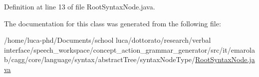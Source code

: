Definition at line 13 of file Root\-Syntax\-Node.\-java.



The documentation for this class was generated from the following file\-:\begin{DoxyCompactItemize}
\item 
/home/luca-\/phd/\-Documents/school luca/dottorato/research/verbal interface/speech\-\_\-workspace/concept\-\_\-action\-\_\-grammar\-\_\-generator/src/it/emarolab/cagg/core/language/syntax/abstract\-Tree/syntax\-Node\-Type/\hyperlink{RootSyntaxNode_8java}{Root\-Syntax\-Node.\-java}\end{DoxyCompactItemize}
